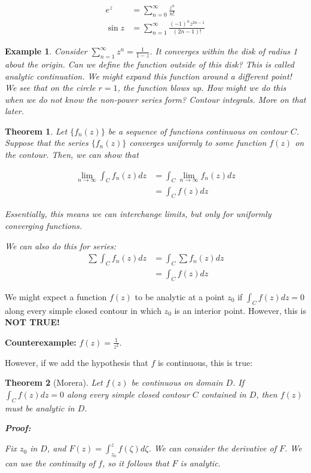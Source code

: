 \documentclass{article}
\newtheorem{theorem}{Theorem}[section]
\newtheorem{ex}{Example}
\theoremstyle{definition}
\begin{document}
\begin{align}
e^z &= \sum_{n=0}^\infty \frac{z^n}{n!}\\
\sin z &= \sum_{n=1}^\infty \frac{(-1)^n z^{2n-1}}{(2n-1)!}
\end{align}


\begin{ex}
Consider $\sum_{n=1}^\infty z^n = \frac{1}{1-z}$. It converges within the disk of radius 1 about the origin.  Can we define the function outside of this disk? This is called \textit{analytic continuation}. We might expand this function around a different point! We see that on the circle $r=1$, the function blows up. How might we do this when we do not know the non-power series form? Contour integrals. More on that later.
\end{ex}

\begin{theorem}
Let $\{f_n(z)\}$ be a sequence of functions continuous on contour $C$. Suppose that the series $\{f_n(z)\}$ converges uniformly to some function $f(z)$ on the contour. Then, we can show that

\begin{align}
\lim_{n\to\infty} \int_{C} f_n(z) dz &= \int_{C} \lim_{n\to\infty} f_n(z) dz \\ 
&= \int_{C}f(z) dz
\end{align}

Essentially, this means we can interchange limits, but only for uniformly converging functions.

We can also do this for series: 
\begin{align}
\sum \int_{C} f_n(z) dz &= \int_{C} \sum f_n(z) dz \\ 
&= \int_{C}f(z) dz
\end{align}
\end{theorem}

We might expect a function $f(z)$ to be analytic at a point $z_0$ if $\int_{C}f(z)dz = 0$ along every simple closed contour in which $z_0$ is an interior point. However, this is \textbf{NOT TRUE!} 

\textbf{Counterexample:} $f(z) = \frac{1}{z^2}$. 

However, if we add the hypothesis that $f$ is continuous, this is true:

\begin{theorem}[Morera]
Let $f(z)$ be continuous on domain $D$. If $\int_{C}f(z)dz = 0$ along every simple closed contour $C$ contained in $D$, then $f(z)$ must be analytic in $D$. 

\textbf{Proof:}

Fix $z_0$ in $D$, and $F(z) = \int_{z_0}^{z} f(\zeta) d\zeta$. We can consider the derivative of $F$. We can use the continuity of $f$, so it follows that $F$ is analytic.

\end{theorem}
\end{document}
